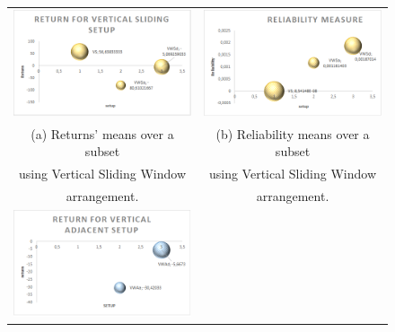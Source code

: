 \documentclass{beamer}
\begin{document}
\begin{frame}
\begin{figure}
    \centering
		\begin{tabular}{c c}
		
        \includegraphics[scale=0.5]{TrendVSReturn.png} &
        \includegraphics[scale=0.5]{TrendVSReliability.png} \\
    \scriptsize (a) Returns' means over a subset  & \scriptsize (b) Reliability means over a subset\\
    \scriptsize using Vertical Sliding Window & \scriptsize using Vertical Sliding Window\\
		\scriptsize arrangement. & \scriptsize arrangement.\\
        \includegraphics[scale=0.5]{TrendVAReturn.png} &

\end{tabular}
\end{figure}
\end{frame}
\end{document}
